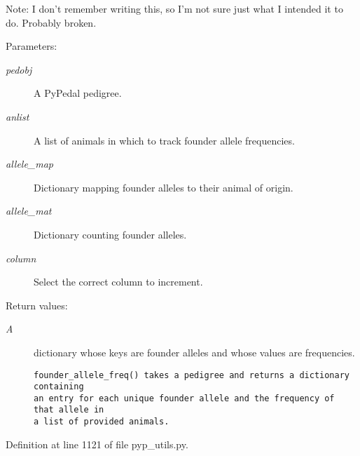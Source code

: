 \begin{Desc}
\item[Note:]I don't remember writing this, so I'm not sure just what I intended it to do. Probably broken. \end{Desc}
\begin{Desc}
\item[Parameters:]
\begin{description}
\item[{\em pedobj}]A Py\-Pedal pedigree. \item[{\em anlist}]A list of animals in which to track founder allele frequencies. \item[{\em allele\_\-map}]Dictionary mapping founder alleles to their animal of origin. \item[{\em allele\_\-mat}]Dictionary counting founder alleles. \item[{\em column}]Select the correct column to increment. \end{description}
\end{Desc}
\begin{Desc}
\item[Return values:]
\begin{description}
\item[{\em A}]dictionary whose keys are founder alleles and whose values are frequencies.

\footnotesize\begin{verbatim}founder_allele_freq() takes a pedigree and returns a dictionary containing
an entry for each unique founder allele and the frequency of that allele in
a list of provided animals.
\end{verbatim}
\normalsize
 \end{description}
\end{Desc}


Definition at line 1121 of file pyp\_\-utils.py.